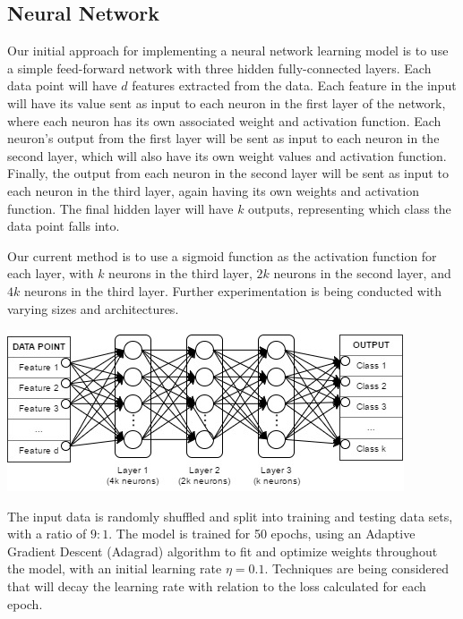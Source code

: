 \documentclass[10pt]{article}
\begin{document}
\begin{multicols}{2}
		\subsection{Neural Network}
		\par
		Our initial approach for implementing a neural network learning model is to use a simple feed-forward network with three hidden fully-connected layers. Each data point will have \(d\) features extracted from the data. Each feature in the input will have its value sent as input to each neuron in the first layer of the network, where each neuron has its own associated weight and activation function. Each neuron's output from the first layer will be sent as input to each neuron in the second layer, which will also have its own weight values and activation function. Finally, the output from each neuron in the second layer will be sent as input to each neuron in the third layer, again having its own weights and activation function. The final hidden layer will have \(k\) outputs, representing which class the data point falls into.
		\par
		Our current method is to use a sigmoid function as the activation function for each layer, with \(k\) neurons in the third layer, \(2k\) neurons in the second layer, and \(4k\) neurons in the third layer. Further experimentation is being conducted with varying sizes and architectures.
		\begin{center}
            \captionsetup{type=figure}
			\includegraphics[scale=0.5]{NeuralNet/Network} \\
			\label{fig:nn_10_class_results}
		\end{center}
		The input data is randomly shuffled and split into training and testing data sets, with a ratio of \(9:1\). The model is trained for 50 epochs, using an Adaptive Gradient Descent (Adagrad) algorithm to fit and optimize weights throughout the model, with an initial learning rate \(\eta = 0.1\). Techniques are being considered that will decay the learning rate with relation to the loss calculated for each epoch.

\end{multicols}
\end{document}
